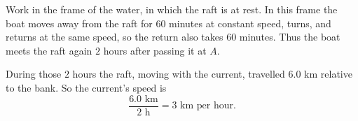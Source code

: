 Work in the frame of the water, in which the raft is at rest. In this frame the boat moves away from the raft for $60$ minutes at constant speed, turns, and returns at the same speed, so the return also takes $60$ minutes. Thus the boat meets the raft again $2$ hours after passing it at $A$.

During those $2$ hours the raft, moving with the current, travelled $6.0$ km relative to the bank. So the current's speed is
\[
\dfrac{6.0\text{ km}}{2\text{ h}}=\boxed{3\text{ km per hour}}.
\]
